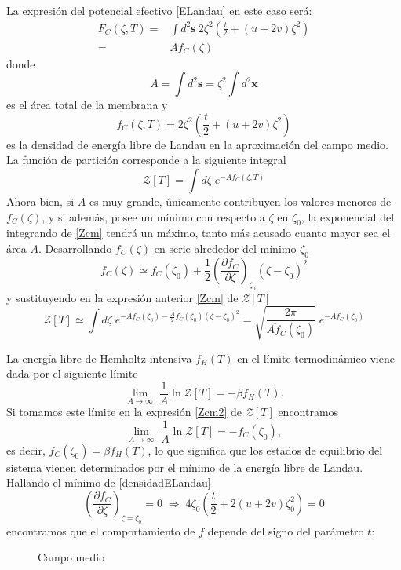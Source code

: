 La expresión del potencial efectivo \eqref{ELandau} en este caso será:
\begin{align}
  F_C(\zeta,T)=&\int\! d^2 \mathbf{s}\ 2\zeta^2\!\left( \frac{t}{2} + (u+2v)\zeta^2\right)\\
  =&Af_C(\zeta)
\end{align}
donde 
$$A=\int d^2 \mathbf{s}=\zeta^2\int d^2 \mathbf{x}$$
es el área total de la membrana y 
\begin{equation}\label{densidadELandau}
f_C(\zeta,T)=2\zeta^2\!\left( \frac{t}{2} + (u+2v)\zeta^2\right)
\end{equation}
es la densidad de energía libre de Landau en la aproximación del campo medio. 
La función de partición corresponde a la siguiente integral
\begin{equation}\label{Zcm}
 \mathcal{Z}[T]=\int d\zeta\;e^{-Af_C(\zeta,T)}
\end{equation}
Ahora bien, si $A$ es muy grande, únicamente contribuyen los valores menores de
$f_C(\zeta)$, y si además, posee un mínimo con respecto a $\zeta$ en
$\zeta_0$, la exponencial del integrando de \eqref{Zcm} tendrá un máximo,
tanto más acusado cuanto mayor sea el área $A$. Desarrollando $f_C(\zeta)$ en
serie alrededor del mínimo $\zeta_0$
\begin{equation*}
f_C(\zeta)\simeq f_C(\zeta_0)+\frac{1}{2}\left(\frac{\partial f_C}{\partial \zeta}\right)_{\!\zeta_0}(\zeta-\zeta_0)^2
\end{equation*}
y sustituyendo en la expresión anterior \eqref{Zcm} de $\mathcal{Z}[T]$ 
\begin{equation}\label{Zcm2}
 \mathcal{Z}[T]\simeq\int
 d\zeta\;e^{-Af_C(\zeta_0)-\frac{A}{2}\ddot{f}_C(\zeta_0)(\zeta-\zeta_0)^2}=
 \sqrt{\frac{2\pi}{A\ddot{f}_C(\zeta_0)}}\; e^{-Af_C(\zeta_0)}
\end{equation}

La energía libre de Hemholtz intensiva $f_H(T)$ en el límite termodinámico
viene dada por el siguiente límite
\begin{equation*}
\lim_{A\rightarrow \infty}\; \frac{1}{A} \ln \mathcal{Z}[T]=-\beta f_H(T).
\end{equation*}
Si tomamos este límite en la expresión \eqref{Zcm2} de $\mathcal{Z}[T]$
encontramos
\begin{equation*}
\lim_{A\rightarrow \infty}\; \frac{1}{A} \ln \mathcal{Z}[T]=-f_C(\zeta_0),
\end{equation*}
es decir, $f_C(\zeta_0)=\beta f_H(T)$, lo que significa que los estados de
equilibrio del sistema vienen determinados por el mínimo de la energía libre
de Landau. Hallando el mínimo de \eqref{densidadELandau} 
\begin{equation*}
\left(\frac{\partial f_C}{\partial \zeta}\right)_{\!\zeta=\zeta_0}\!=0 \;
\Rightarrow \; 4\zeta_0\left(\frac{t}{2}+2(u+2v)\zeta_0^2\right)=0
\end{equation*}
encontramos que el comportamiento de $f$ depende del signo del parámetro $t$:
\begin{figure}[h]
\centering
 \resizebox{\columnwidth}{!}{}
\caption{Campo medio}
\end{figure} 

